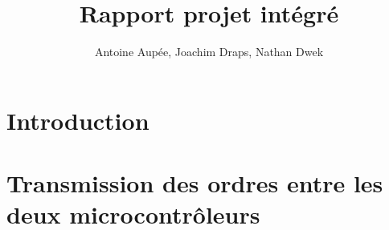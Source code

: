 \documentclass[a4paper, 11pt, frenchb]{report}
\title{Rapport projet intégré}
\author{Antoine Aupée, Joachim Draps, Nathan Dwek}
\begin{document}

\setcounter{page}{2}
\tableofcontents

\chapter{Introduction}


\chapter{Transmission des ordres entre les deux microcontrôleurs}

\end{document}
